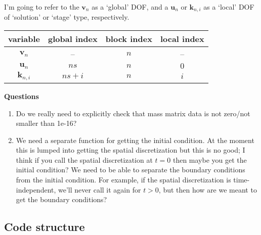 \documentclass[a4paper,10pt]{article}
\begin{document}
I'm going to refer to the $\mathbf{v}_n$ as a `global' DOF, and a $\mathbf{u}_n$ or $\mathbf{k}_{n,i}$ as a `local' DOF of `solution' or `stage' type, respectively. 
\begin{table}
\centering
\begin{tabular}{c|c|c|c}
variable & global index & block index & local index \\ \hline 
$\mathbf{v}_n$ & -- & $n$ & --  \\
$\mathbf{u}_n$ & $ns$ & $n$ & $0$  \\
$\mathbf{k}_{n,i}$ & $ns+i$ & $n$ & $i$  \\ 
\end{tabular}
\end{table}


\textbf{Questions}
\begin{enumerate}
\item Do we really need to explicitly check that mass matrix data is not zero/not smaller than 1e-16?
\item We need a separate function for getting the initial condition. At the moment this is lumped into getting the spatial discretization but this is no good; I think if you call the spatial discretization at $t=0$ then maybe you get the initial condition? We need to be able to separate the boundary conditions from the initial condition. For example, if the spatial discretization is time-independent, we'll never call it again for $t > 0$, but then how are we meant to get the boundary conditions?
\end{enumerate}


\subsection{Code structure}
\end{document}
